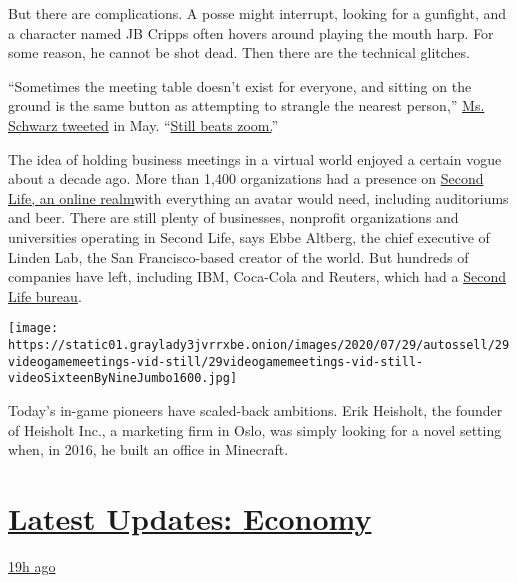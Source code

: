 But there are complications. A posse might interrupt, looking for a
gunfight, and a character named JB Cripps often hovers around playing
the mouth harp. For some reason, he cannot be shot dead. Then there are
the technical glitches.

``Sometimes the meeting table doesn't exist for everyone, and sitting on
the ground is the same button as attempting to strangle the nearest
person,''
\href{https://twitter.com/vivschwarz/status/1261577497105358848}{Ms.
Schwarz tweeted} in May.
``\href{https://www.nytimes3xbfgragh.onion/2020/06/29/business/zoom-shirt.html}{Still
beats zoom.}''

The idea of holding business meetings in a virtual world enjoyed a
certain vogue about a decade ago. More than 1,400 organizations had a
presence on
\href{https://www.nytimes3xbfgragh.onion/2006/10/19/technology/19virtual.html}{Second
Life, an online realm}with everything an avatar would need, including
auditoriums and beer. There are still plenty of businesses, nonprofit
organizations and universities operating in Second Life, says Ebbe
Altberg, the chief executive of Linden Lab, the San Francisco-based
creator of the world. But hundreds of companies have left, including
IBM, Coca-Cola and Reuters, which had a
\href{https://www.nytimes3xbfgragh.onion/2006/10/16/technology/16reuters.html}{Second
Life bureau}.

\texttt{[image: https://static01.graylady3jvrrxbe.onion/images/2020/07/29/autossell/29videogamemeetings-vid-still/29videogamemeetings-vid-still-videoSixteenByNineJumbo1600.jpg]}

Today's in-game pioneers have scaled-back ambitions. Erik Heisholt, the
founder of Heisholt Inc., a marketing firm in Oslo, was simply looking
for a novel setting when, in 2016, he built an office in Minecraft.

\hypertarget{latest-updates-economy}{%
\section{\texorpdfstring{\href{https://www.nytimes3xbfgragh.onion/live/2020/07/31/business/stock-market-today-coronavirus?action=click\&pgtype=Article\&state=default\&region=MAIN_CONTENT_1\&context=storylines_live_updates}{Latest
Updates:
Economy}}{Latest Updates: Economy}}\label{latest-updates-economy}}

\href{https://www.nytimes3xbfgragh.onion/live/2020/07/31/business/stock-market-today-coronavirus?action=click\&pgtype=Article\&state=default\&region=MAIN_CONTENT_1\&context=storylines_live_updates\#kodaks-chief-executive-was-given-stock-options-then-the-share-price-spiked-1000-percent}{19h
ago}

